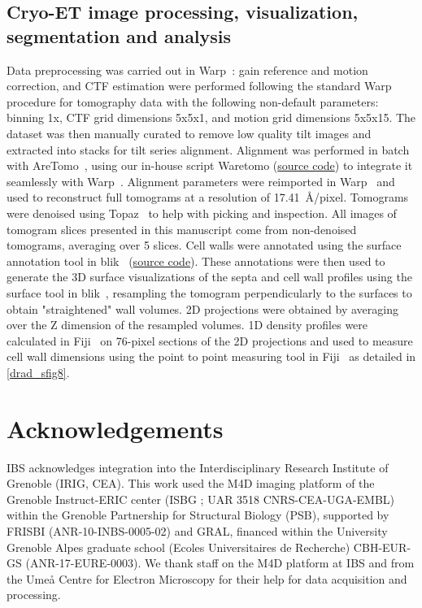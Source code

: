 \subsection{Cryo-ET image processing, visualization, segmentation and analysis}
Data preprocessing was carried out in Warp~\cite{tegunovRealtimeCryoelectronMicroscopy2019}: gain reference and motion correction, and CTF estimation were performed following the standard Warp~\cite{tegunovRealtimeCryoelectronMicroscopy2019} procedure for tomography data with the following non-default parameters: binning 1x, CTF grid dimensions 5x5x1, and motion grid dimensions 5x5x15.
The dataset was then manually curated to remove low quality tilt images and extracted into stacks for tilt series alignment.
Alignment was performed in batch with AreTomo~\cite{zhengAreTomoIntegratedSoftware2022}, using our in-house script Waretomo (\href{https://doi.org/10.5281/zenodo.13350542}{source code}) to integrate it seamlessly with Warp~\cite{tegunovRealtimeCryoelectronMicroscopy2019}.
Alignment parameters were reimported in Warp~\cite{tegunovRealtimeCryoelectronMicroscopy2019} and used to reconstruct full tomograms at a resolution of \qty{17.41}{\angstrom/pixel}.
Tomograms were denoised using Topaz~\cite{beplerTopazDenoiseGeneralDeep2020} to help with picking and inspection.
All images of tomogram slices presented in this manuscript come from non-denoised tomograms, averaging over 5 slices.
Cell walls were annotated using the surface annotation tool in blik~\cite{gaifasBlikExtensible3D2024} (\href{https://zenodo.org/records/10894490}{source code}).
These annotations were then used to generate the 3D surface visualizations of the septa and cell wall profiles using the surface tool in blik~\cite{gaifasBlikExtensible3D2024}, resampling the tomogram perpendicularly to the surfaces to obtain "straightened" wall volumes.
2D projections were obtained by averaging over the Z dimension of the resampled volumes.
1D density profiles were calculated in Fiji~\cite{schindelinFijiOpensourcePlatform2012} on 76-pixel sections of the 2D projections and used to measure cell wall dimensions using the point to point measuring tool in Fiji~\cite{schindelinFijiOpensourcePlatform2012} as detailed in \autoref{drad_sfig8}.

\section{Acknowledgements}
IBS acknowledges integration into the Interdisciplinary Research Institute of Grenoble (IRIG, CEA).
This work used the M4D imaging platform of the Grenoble Instruct-ERIC center (ISBG ; UAR 3518 CNRS-CEA-UGA-EMBL) within the Grenoble Partnership for Structural Biology (PSB), supported by FRISBI (ANR-10-INBS-0005-02) and GRAL, financed within the University Grenoble Alpes graduate school (Ecoles Universitaires de Recherche) CBH-EUR-GS (ANR-17-EURE-0003).
We thank staff on the M4D platform at IBS and from the Umeå Centre for Electron Microscopy for their help for data acquisition and processing.

